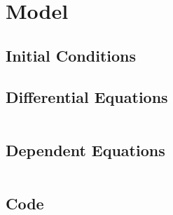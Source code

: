 \documentclass[10pt]{article}
\begin{document}
\newpage
\section{Model}
\subsection{Initial Conditions}

\subsection{Differential Equations}
\begin{lstlisting}[basicstyle=\small] 
%%ODE1%%
\end{lstlisting}

\subsection{Dependent Equations}
\begin{lstlisting}[basicstyle=\small] 
%%ODE2%%
\end{lstlisting}

\newpage
\subsection{Code}
\begin{lstlisting}[basicstyle=\small] 
%%CODE%%
\end{lstlisting}
\end{document}
